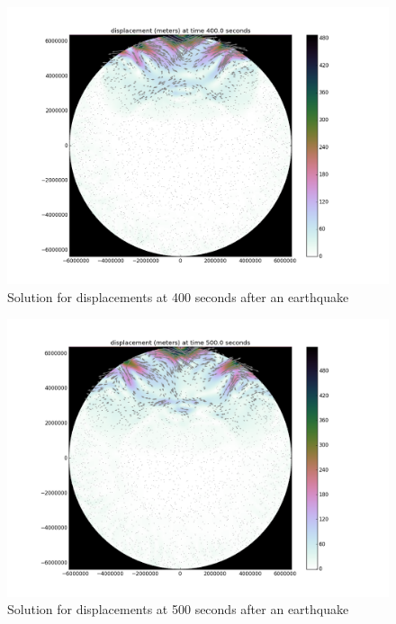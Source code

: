 \documentclass[12pt]{article}
\begin{document}
\begin{figure}
\includegraphics[scale=0.4]{figures/400s}
\centering
\caption{Solution for displacements at 400 seconds after an earthquake}
\end{figure}

\begin{figure}
\includegraphics[scale=0.4]{figures/500s}
\centering
\caption{Solution for displacements at 500 seconds after an earthquake}
\end{figure}
\end{document}
